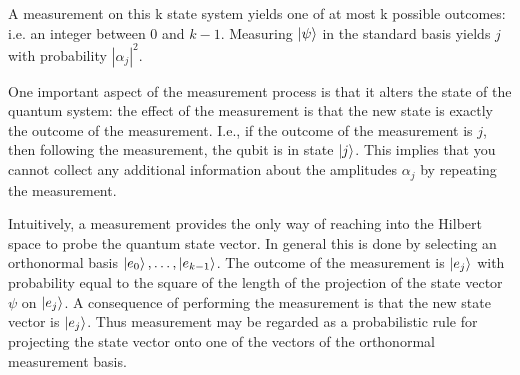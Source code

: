 A measurement on this k state system yields one of at most k possible
outcomes: i.e. an integer between $0$ and $k-1$. Measuring $\ket{\psi}$ in the standard
basis yields $j$ with probability $|\alpha_j|^2$. 

One important aspect of the measurement process is that it alters the
state of the quantum system: the effect of the measurement is that the new
state is exactly the outcome of the measurement. I.e., if the outcome of the
measurement is $j$, then following the measurement, the qubit is in state $\ket{j}$.
This implies that you cannot collect any additional information about the
amplitudes $\alpha_j$ by repeating the measurement.

Intuitively, a measurement provides the only way of reaching into the
Hilbert space to probe the quantum state vector. In general this is done by
selecting an orthonormal basis $\ket{e_0},\ldots,\ket{e_{k-1}}$. The outcome of the measurement is $\ket{e_j}$ with probability equal to the square of the length of the projection
of the state vector $\psi$ on $\ket{e_j}$. A consequence of performing the measurement
is that the new state vector is $\ket{e_j}$. Thus measurement may be regarded as a
probabilistic rule for projecting the state vector onto one of the vectors of the
orthonormal measurement basis.

